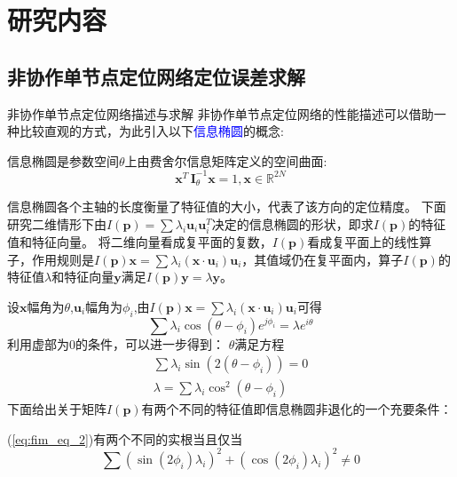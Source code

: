 \section{研究内容}\label{section:research_content}
\subsection{非协作单节点定位网络定位误差求解}\label{subsection:circle_general}
{非协作单节点定位网络描述与求解}
非协作单节点定位网络的性能描述可以借助一种比较直观的方式，为此引入以下\textcolor{blue}{信息椭圆}的概念\cite{LimitBound}:
\begin{definition}
信息椭圆是参数空间$\theta$上由费舍尔信息矩阵定义的空间曲面:
\begin{equation}\label{eq:ie}
\bm{x}^T\,\bm{I}_{\theta}^{-1}\bm{x}=1,\bm{x}\in \mathbb{R}^{2N}
\end{equation}
\end{definition}
信息椭圆各个主轴的长度衡量了特征值的大小，代表了该方向的定位精度。
下面研究二维情形下由$I(\bm{p})=\sum \lambda_i \bm{u}_i \bm{u}_i^T$决定的信息椭圆的形状，即求$I(\bm{p})$的特征值和特征向量。
将二维向量看成复平面的复数，$I(\bm{p})$看成复平面上的线性算子，作用规则是$I(\bm{p})\bm{x}=\sum \lambda_i (\bm{x}\cdot\bm{u}_i)\bm{u}_i$，其值域仍在复平面内，算子$I(\bm{p})$的特征值$\lambda$和特征向量$\bm{y}$满足$I(\bm{p})\bm{y}=\lambda \bm{y}$。


设$\bm{x}$幅角为$\theta$,$\bm{u}_i$幅角为$\phi_i$,由$I(\bm{p})\bm{x}=\sum \lambda_i (\bm{x}\cdot\bm{u}_i)\bm{u}_i$可得
\begin{equation}
\sum \lambda_i \cos(\theta-\phi_i)e^{j\phi_i}=\lambda e^{i\theta}
\end{equation}
利用虚部为0的条件，可以进一步得到：
$\theta$满足方程
\begin{eqnarray}\label{eq:fim_eq_1}
\sum \lambda_i \sin(2(\theta-\phi_i))=0\\
\lambda=\sum \lambda_i \cos^2(\theta-\phi_i)\label{eq:fim_eq_2}
\end{eqnarray}
下面给出关于矩阵$I(\bm{p})$有两个不同的特征值即信息椭圆非退化的一个充要条件：
\begin{theorem}
(\ref{eq:fim_eq_2})有两个不同的实根当且仅当\[
\sum (\sin(2\phi_i)\lambda_i)^2+(\cos(2\phi_i)\lambda_i)^2 \neq 0\]
\end{theorem}

